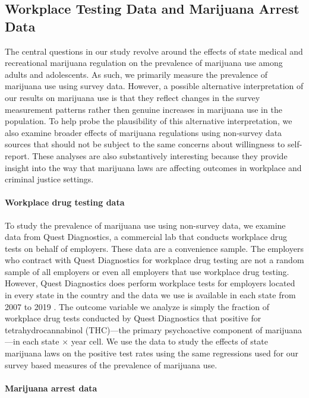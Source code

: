 \documentclass[12pt]{article}%
\begin{document}
\clearpage

\subsection{Workplace Testing Data and Marijuana Arrest Data}

The central questions in our study revolve around the effects of state medical and recreational marijuana regulation on the prevalence of marijuana use among adults and adolescents. As such, we primarily measure the prevalence of marijuana use using survey data. However, a possible alternative interpretation of our results on marijuana use is that they reflect changes in the survey measurement patterns rather then genuine increases in marijuana use in the population. To help probe the plausibility of this alternative interpretation, we also examine broader effects of marijuana regulations using non-survey data sources that should not be subject to the same concerns about willingness to self-report. These analyses are also substantively interesting because they provide insight into the way that marijuana laws are affecting outcomes in workplace and criminal justice settings.

\paragraph{Workplace drug testing data}

To study the prevalence of marijuana use using non-survey data, we examine data from Quest Diagnostics, a commercial lab that conducts workplace drug tests on behalf of employers. These data are a convenience sample. The employers who contract with Quest Diagnostics for workplace drug testing are not a random sample of all employers or even all employers that use workplace drug testing. However, Quest Diagnostics does perform workplace tests for employers located in every state in the country and the data we use is available in each state from 2007 to 2019 \citep{questdiagnostics}. The outcome variable we analyze is simply the fraction of workplace drug tests conducted by Quest Diagnostics that positive for tetrahydrocannabinol (THC)---the primary psychoactive component of marijuana---in each state $\times$ year cell.
We use the data to study the effects of state marijuana laws on the positive test rates using the same regressions used for our survey based measures of the prevalence of marijuana use.

\paragraph{Marijuana arrest data}
\end{document}
